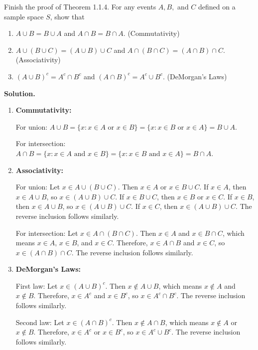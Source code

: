 \begin{problembox}
Finish the proof of Theorem 1.1.4. For any events $A, B,$ and $C$ defined on a sample space $S$, show that
\begin{enumerate}[label=(\alph*)]
    \item $A \cup B = B \cup A$ and $A \cap B = B \cap A$. (Commutativity)
    \item $A \cup (B \cup C) = (A \cup B) \cup C$ and $A \cap (B \cap C) = (A \cap B) \cap C$. (Associativity)
    \item $(A \cup B)^c = A^c \cap B^c$ and $(A \cap B)^c = A^c \cup B^c$. (DeMorgan's Laws)
\end{enumerate}\end{problembox}

\noindent\textbf{Solution.}
\begin{enumerate}[label=(\alph*)]
    \item \textbf{Commutativity:}
    
    For union: $A \cup B = \{x : x \in A \text{ or } x \in B\} = \{x : x \in B \text{ or } x \in A\} = B \cup A$.
    
    For intersection: $A \cap B = \{x : x \in A \text{ and } x \in B\} = \{x : x \in B \text{ and } x \in A\} = B \cap A$.
    
    \item \textbf{Associativity:}
    
    For union: Let $x \in A \cup (B \cup C)$. Then $x \in A$ or $x \in B \cup C$. If $x \in A$, then $x \in A \cup B$, so $x \in (A \cup B) \cup C$. If $x \in B \cup C$, then $x \in B$ or $x \in C$. If $x \in B$, then $x \in A \cup B$, so $x \in (A \cup B) \cup C$. If $x \in C$, then $x \in (A \cup B) \cup C$. The reverse inclusion follows similarly.
    
    For intersection: Let $x \in A \cap (B \cap C)$. Then $x \in A$ and $x \in B \cap C$, which means $x \in A$, $x \in B$, and $x \in C$. Therefore, $x \in A \cap B$ and $x \in C$, so $x \in (A \cap B) \cap C$. The reverse inclusion follows similarly.
    
    \item \textbf{DeMorgan's Laws:}
    
    First law: Let $x \in (A \cup B)^c$. Then $x \notin A \cup B$, which means $x \notin A$ and $x \notin B$. Therefore, $x \in A^c$ and $x \in B^c$, so $x \in A^c \cap B^c$. The reverse inclusion follows similarly.
    
    Second law: Let $x \in (A \cap B)^c$. Then $x \notin A \cap B$, which means $x \notin A$ or $x \notin B$. Therefore, $x \in A^c$ or $x \in B^c$, so $x \in A^c \cup B^c$. The reverse inclusion follows similarly.
\end{enumerate}

